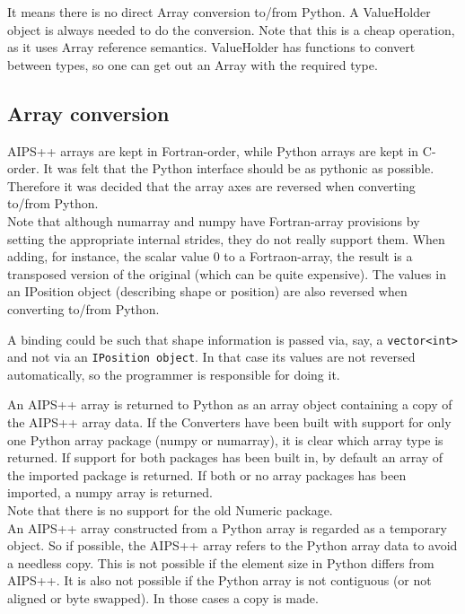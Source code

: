 It means there is no direct Array conversion to/from Python. A
ValueHolder object is always needed to do the conversion. Note that
this is a cheap operation, as it uses Array reference semantics.
ValueHolder has functions to convert between types, so one can get
out an Array with the required type.

\subsection{Array conversion}
AIPS++ arrays are kept in Fortran-order, while Python arrays are kept
in C-order. It was felt that the Python interface should be as 
pythonic as possible. Therefore it was decided that the array axes are
reversed when converting to/from Python.
\\Note that although numarray and numpy have Fortran-array provisions
by setting the appropriate internal strides,
they do not really support them. When adding, for instance, the scalar
value 0 to a Fortraon-array, the  result is a transposed version of the
original (which can be quite expensive).
The values in an IPosition object (describing shape or
position) are also reversed when converting to/from Python.

A binding could be such that shape information is passed via, say, a
\texttt{vector<int>} and not via an \texttt{IPosition object}.
In that case its values
are not reversed automatically, so the programmer is
responsible for doing it.

An AIPS++ array is returned to Python as an array object
containing a copy of the AIPS++ array data. If the Converters have
been built with support for only one Python array package (numpy or numarray),
it is clear which array type is returned. If support for both
packages has been built in, by default an array of the imported
package is returned. If both or no array packages has been imported, a numpy
array is returned.
\\Note that there is no support for the old Numeric package.
\\An AIPS++ array constructed from a Python array is regarded as a
temporary object. So if possible, the AIPS++ array refers to the
Python array data to avoid a needless copy. This is not possible if
the element size in Python differs from AIPS++. It is also not
possible if the Python array is not contiguous (or not aligned or
byte swapped). In those cases a copy is made.

